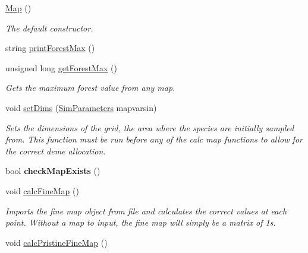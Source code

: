 \begin{DoxyCompactItemize}
\item 
\hyperlink{class_map_a0f5ad0fd4563497b4214038cbca8b582}{Map} ()\hypertarget{class_map_a0f5ad0fd4563497b4214038cbca8b582}{}\label{class_map_a0f5ad0fd4563497b4214038cbca8b582}

\begin{DoxyCompactList}\small\item\em The default constructor. \end{DoxyCompactList}\item 
string \hyperlink{class_map_ad426134803fb70813613e5bd34908811}{print\+Forest\+Max} ()
\item 
unsigned long \hyperlink{class_map_a2267868566b8c925a5d7f2200e8f6491}{get\+Forest\+Max} ()
\begin{DoxyCompactList}\small\item\em Gets the maximum forest value from any map. \end{DoxyCompactList}\item 
void \hyperlink{class_map_a4265717341e63a4662bf7ada49cc0c3d}{set\+Dims} (\hyperlink{struct_sim_parameters}{Sim\+Parameters} mapvarsin)
\begin{DoxyCompactList}\small\item\em Sets the dimensions of the grid, the area where the species are initially sampled from. This function must be run before any of the calc map functions to allow for the correct deme allocation. \end{DoxyCompactList}\item 
bool {\bfseries check\+Map\+Exists} ()\hypertarget{class_map_ab74d57e0de40b6e16c7bb62489ecff5c}{}\label{class_map_ab74d57e0de40b6e16c7bb62489ecff5c}

\item 
void \hyperlink{class_map_ab3c9e77675ad9ca1d34e9ff8e861901d}{calc\+Fine\+Map} ()\hypertarget{class_map_ab3c9e77675ad9ca1d34e9ff8e861901d}{}\label{class_map_ab3c9e77675ad9ca1d34e9ff8e861901d}

\begin{DoxyCompactList}\small\item\em Imports the fine map object from file and calculates the correct values at each point. Without a map to input, the fine map will simply be a matrix of 1s. \end{DoxyCompactList}\item 
void \hyperlink{class_map_ab1d1bac59d3e1518deaa2ebc561a7f82}{calc\+Pristine\+Fine\+Map} ()\hypertarget{class_map_ab1d1bac59d3e1518deaa2ebc561a7f82}{}\label{class_map_ab1d1bac59d3e1518deaa2ebc561a7f82}


\end{DoxyCompactItemize}
